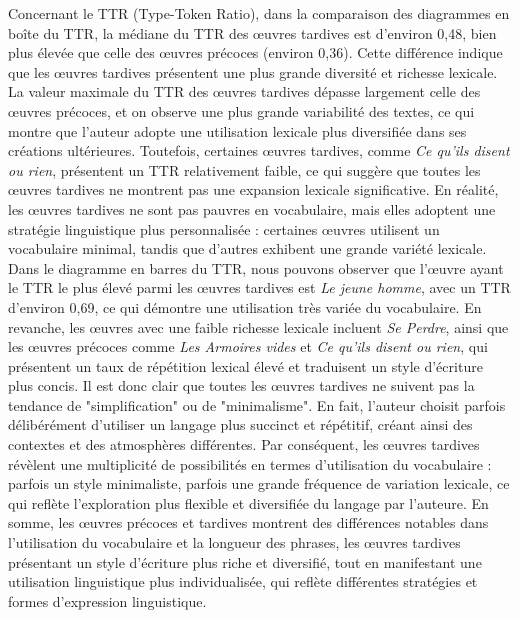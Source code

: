 \newpage
Concernant le TTR (Type-Token Ratio), dans la comparaison des diagrammes en boîte du TTR, la médiane du TTR des œuvres tardives est d'environ 0,48, bien plus élevée que celle des œuvres précoces (environ 0,36). Cette différence indique que les œuvres tardives présentent une plus grande diversité et richesse lexicale. La valeur maximale du TTR des œuvres tardives dépasse largement celle des œuvres précoces, et on observe une plus grande variabilité des textes, ce qui montre que l'auteur adopte une utilisation lexicale plus diversifiée dans ses créations ultérieures. Toutefois, certaines œuvres tardives, comme \textit{Ce qu'ils disent ou rien}, présentent un TTR relativement faible, ce qui suggère que toutes les œuvres tardives ne montrent pas une expansion lexicale significative. En réalité, les œuvres tardives ne sont pas pauvres en vocabulaire, mais elles adoptent une stratégie linguistique plus personnalisée : certaines œuvres utilisent un vocabulaire minimal, tandis que d'autres exhibent une grande variété lexicale.\\

Dans le diagramme en barres du TTR, nous pouvons observer que l'œuvre ayant le TTR le plus élevé parmi les œuvres tardives est \textit{Le jeune homme}, avec un TTR d'environ 0,69, ce qui démontre une utilisation très variée du vocabulaire. En revanche, les œuvres avec une faible richesse lexicale incluent \textit{Se Perdre}, ainsi que les œuvres précoces comme \textit{Les Armoires vides} et \textit{Ce qu'ils disent ou rien}, qui présentent un taux de répétition lexical élevé et traduisent un style d'écriture plus concis. Il est donc clair que toutes les œuvres tardives ne suivent pas la tendance de "simplification" ou de "minimalisme". En fait, l'auteur choisit parfois délibérément d’utiliser un langage plus succinct et répétitif, créant ainsi des contextes et des atmosphères différentes. Par conséquent, les œuvres tardives révèlent une multiplicité de possibilités en termes d’utilisation du vocabulaire : parfois un style minimaliste, parfois une grande fréquence de variation lexicale, ce qui reflète l’exploration plus flexible et diversifiée du langage par l’auteure. En somme, les œuvres précoces et tardives montrent des différences notables dans l'utilisation du vocabulaire et la longueur des phrases, les œuvres tardives présentant un style d’écriture plus riche et diversifié, tout en manifestant une utilisation linguistique plus individualisée, qui reflète différentes stratégies et formes d’expression linguistique.

